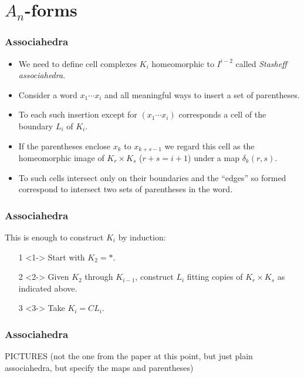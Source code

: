 \documentclass{beamer}
\theoremstyle{definition}
\begin{document}
\section{$A_n$-forms}
\begin{frame}
\frametitle{Associahedra}
\begin{itemize}
\item<1->We need to define cell complexes $K_i$ homeomorphic to $I^{i-2}$ called \emph{Stasheff associahedra}. %
\item<2-> Consider a word $x_1\cdots x_i$ and all meaningful ways to insert a set of parentheses.
\item<3-> To each such insertion except for $(x_1\cdots x_i)$ corresponds a cell of the boundary $L_i$ of $K_i$.
\item<4-> If the parentheses enclose $x_k$ to $x_{k+s-1}$ we regard this cell as the homeomorphic image of $K_r\times K_s$ ($r+s=i+1$) under a map $\delta_k(r,s)$.
\item<5-> To such cells intersect only on their boundaries and the ``edges'' so formed correspond to intersect two sets of parentheses in the word. %
 \end{itemize}
\end{frame}



\begin{frame}
\frametitle{Associahedra}
This is enough to construct $K_i$ by induction:
\begin{itemize}
\item[1]<1-> Start with $K_2=*$.
\item[2]<2-> Given $K_2$ through $K_{i-1}$, construct $L_i$ fitting copies of $K_r\times K_s$ as indicated above.
\item[3]<3-> Take $K_i=CL_i$.
\end{itemize}
\end{frame}

\begin{frame}
\frametitle{Associahedra}
PICTURES (not the one from the paper at this point, but just plain associahedra, but specify the maps and parentheses)
\end{frame}
\end{document}

